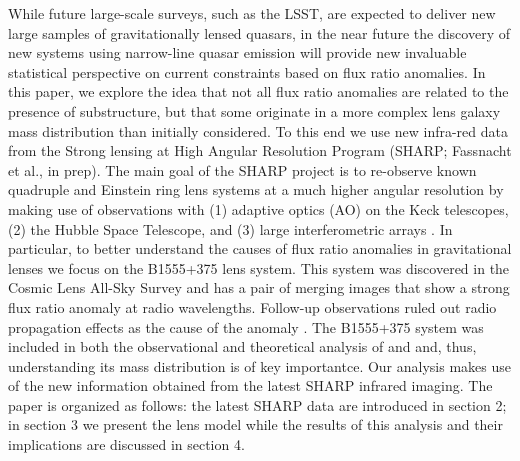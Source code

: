 \documentclass[useAMS,usenatbib]{mn2e}
\begin{document}
While future large-scale surveys, such as the LSST, are expected to
deliver new large samples of gravitationally lensed quasars, in the
near future the discovery of new systems using narrow-line quasar
emission \citep{N14} will provide new invaluable statistical
perspective on current constraints based on flux ratio anomalies.  In
this paper, we explore the idea that not all flux ratio anomalies are
related to the presence of substructure, but that some originate in a
more complex lens galaxy mass distribution than initially
considered. To this end we use new infra-red data from the Strong
lensing at High Angular Resolution Program (SHARP; Fassnacht et al.,
in prep). The main goal of the SHARP project is to re-observe known
quadruple and Einstein ring lens systems at a much higher angular
resolution by making use of observations with (1) adaptive optics (AO)
on the Keck telescopes, (2) the Hubble Space Telescope, and (3) large
interferometric arrays \citep{SHARP12,V12}. In particular, to better
understand the causes of flux ratio anomalies in gravitational lenses
we focus on the B1555+375 lens system\citep{Marlow}.  This system was
discovered in the Cosmic Lens All-Sky Survey \citep{CLASS1,CLASS2} and
has a pair of merging images that show a strong flux ratio anomaly at
radio wavelengths.  Follow-up observations ruled out radio propagation
effects as the cause of the anomaly \citep{K03,KD04}.  The B1555+375
system was included in both the observational and theoretical analysis
of \citet{Dalal2002} and \citet{Xu14} and, thus, understanding its
mass distribution is of key importantce.  Our analysis makes use of
the new information obtained from the latest SHARP infrared imaging.
The paper is organized as follows: the latest SHARP data are
introduced in section 2; in section 3 we present the lens model while
the results of this analysis and their implications are discussed in
section 4.
\end{document}

